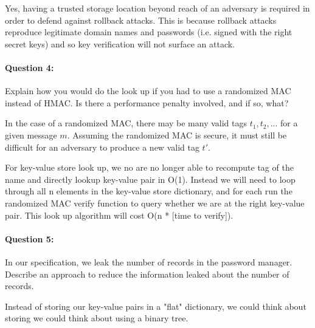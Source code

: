 \documentclass[12pt,letterpaper,twoside]{article}
\begin{document}
Yes, having a trusted storage location beyond reach of an adversary is required
in order to defend against rollback attacks. This is because rollback attacks
reproduce legitimate domain names and passwords (i.e. signed with the right
secret keys) and so key verification will not surface an attack.

\paragraph{Question 4: } Explain how you would do the look up if you had to use
a randomized MAC instead of HMAC. Is there a performance penalty involved, and if
so, what?

In the case of a randomized MAC, there may be many valid tags $t_1, t_2, ...$
for a given message $m$. Assuming the randomized MAC is secure, it must still
be difficult for an adversary to produce a new valid tag $t\prime$.

For key-value store look up, we no are no longer able to recompute tag of the
name and directly lookup key-value pair in O(1). Instead we will need to loop
through all n elements in the key-value store dictionary, and for each run the
randomized MAC verify function to query whether we are at the right key-value
pair. This look up algorithm will cost O(n * [time to verify]).


\paragraph{Question 5: } In our specification, we leak the number of records in
the password manager. Describe an approach to reduce the information leaked
about the number of records.

Instead of storing our key-value pairs in a "flat" dictionary, we could think
about storing we could think about using a binary tree.
\end{document}
